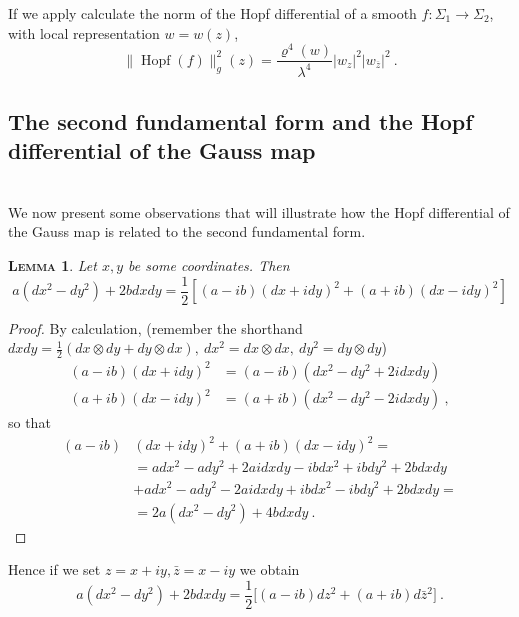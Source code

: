 \documentclass[a4paper,11pt,openright,twoside]{book}
\renewcommand{\rho}{\varrho}
\newcommand{\Hopf}{\operatorname{Hopf}}
\newcommand{\1}{\mathds{1}}
\theoremstyle{plain}
\newtheorem{lemma}[thm]{\textsc{Lemma}}
\theoremstyle{definition}
\theoremstyle{remark}
\begin{document}
If we apply calculate the norm of the Hopf differential of a smooth $f:\Sigma_1\to \Sigma_2$, with local representation $w=w(z)$, 
\[\|\Hopf(f)\|_g^2(z) = \frac{\rho^4(w)}{\lambda^4} |w_z|^2|w_{\overline{z}}|^2\ .\] 
\subsection{The second fundamental form and the Hopf differential of the Gauss map}\mbox{}\\
We now present some observations that will illustrate how the Hopf differential of the Gauss map is related to the second fundamental form.
\begin{lemma}\label{lm:lemmaqforms}
	Let $x,y$ be some coordinates. Then
	\[
		a(dx^2-dy^2) +2bdxdy = \frac{1}{2}[(a-ib)(dx+idy)^2+(a+ib)(dx-idy)^2]
	\]
\end{lemma}
\begin{proof}
	By calculation, (remember the shorthand $dxdy = \frac{1}{2} (dx \otimes dy+dy\otimes dx),\ dx^2 = dx\otimes dx,\ dy^2=dy\otimes dy$) 
	\begin{align*}
		(a-ib)(dx+idy)^2&= (a-ib) (dx^2-dy^2+2idxdy)\\
		(a+ib)(dx-idy)^2&=(a+ib)(dx^2-dy^2-2idxdy)
	\ , 
	\end{align*}
	so that 
	\begin{align*}
		(a-ib)&(dx+idy)^2+(a+ib)(dx-idy)^2= \\
		&= adx^2-ady^2+2aidxdy-ibdx^2+ibdy^2+2bdxdy\\
		&+adx^2-ady^2-2aidxdy+ibdx^2-ibdy^2+2bdxdy=\\
		&= 2a(dx^2-dy^2)+4bdxdy\ .
	\end{align*}
\end{proof}
Hence if we set $z = x+iy, \bar z = x-iy$ we obtain
\[
	a(dx^2-dy^2)+2bdxdy = \frac{1}{2}\big[(a-ib)dz^2+(a+ib)d\bar z^2\big]
\ . 
\]
\end{document}
